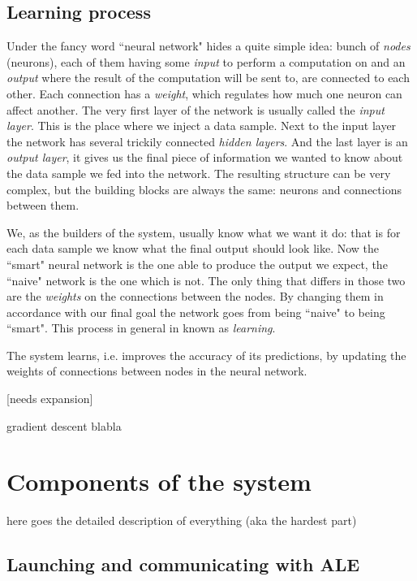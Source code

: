 \documentclass[a4paper,12pt]{article}
\begin{document}
\subsection{Learning process}
Under the fancy word ``neural network" hides a quite simple idea: bunch of \emph{nodes} (neurons), each of them having some \emph{input} to perform a computation on and an \emph{output} where the result of the computation will be sent to, are connected to each other. Each connection has a \emph{weight}, which regulates how much one neuron can affect another. The very first layer of the network is usually called the \emph{input layer}. This is the place where we inject a data sample. Next to the input layer the network has several trickily connected \emph{hidden layers}. And the last layer is an \emph{output layer}, it gives us the final piece of information we wanted to know about the data sample we fed into the network. The resulting structure can be very complex, but the building blocks are always the same: neurons and connections between them.

We, as the builders of the system, usually know what we want it do: that is for each data sample we know what the final output should look like. Now the ``smart" neural network is the one able to produce the output we expect, the ``naive" network is the one which is not. The only thing that differs in those two are the \emph{weights} on the connections between the nodes. By changing them in accordance with our final goal the network goes from being ``naive" to being ``smart". This process in general in known as \emph{learning}.

The system learns, i.e. improves the accuracy of its predictions, by updating the weights of connections between nodes in the neural network.

[needs expansion]

gradient descent blabla



%
%
\pagebreak
\section{Components of the system}
here goes the detailed description of everything (aka the hardest part)


\subsection{Launching and communicating with ALE}
\end{document}
